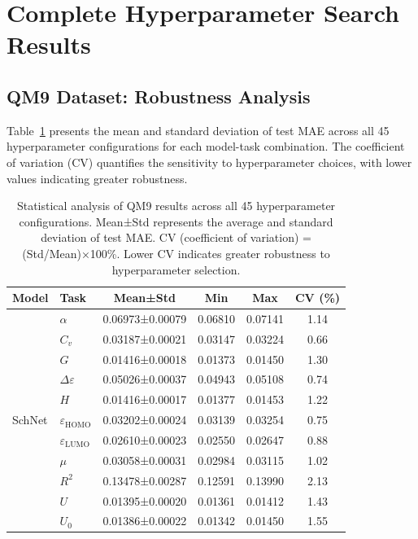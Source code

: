 \section{Complete Hyperparameter Search Results}

\subsection{QM9 Dataset: Robustness Analysis}

Table~\ref{tab:supp_qm9_stats} presents the mean and standard deviation of test MAE across all 45 hyperparameter configurations for each model-task combination. The coefficient of variation (CV) quantifies the sensitivity to hyperparameter choices, with lower values indicating greater robustness.

\begin{table}[!htb]
  \scriptsize
  \centering
  \caption{Statistical analysis of QM9 results across all 45 hyperparameter configurations. Mean±Std represents the average and standard deviation of test MAE. CV (coefficient of variation) = (Std/Mean)×100\%. Lower CV indicates greater robustness to hyperparameter selection.}
  \label{tab:supp_qm9_stats}
    \begin{tabular}{llcccc}
    \toprule
    \textbf{Model} & \textbf{Task} & \textbf{Mean±Std} & \textbf{Min} & \textbf{Max} & \textbf{CV (\%)} \\
    \midrule
    \multirow{12}{*}{SchNet}
    & $\alpha$ & 0.06973±0.00079 & 0.06810 & 0.07141 & 1.14 \\
    & $C_v$ & 0.03187±0.00021 & 0.03147 & 0.03224 & 0.66 \\
    & $G$ & 0.01416±0.00018 & 0.01373 & 0.01450 & 1.30 \\
    & $\Delta\varepsilon$ & 0.05026±0.00037 & 0.04943 & 0.05108 & 0.74 \\
    & $H$ & 0.01416±0.00017 & 0.01377 & 0.01453 & 1.22 \\
    & $\varepsilon_{\text{HOMO}}$ & 0.03202±0.00024 & 0.03139 & 0.03254 & 0.75 \\
    & $\varepsilon_{\text{LUMO}}$ & 0.02610±0.00023 & 0.02550 & 0.02647 & 0.88 \\
    & $\mu$ & 0.03058±0.00031 & 0.02984 & 0.03115 & 1.02 \\
    & $R^2$ & 0.13478±0.00287 & 0.12591 & 0.13990 & 2.13 \\
    & $U$ & 0.01395±0.00020 & 0.01361 & 0.01412 & 1.43 \\
    & $U_0$ & 0.01386±0.00022 & 0.01342 & 0.01450 & 1.55 \\

\end{tabular}
\end{table}
